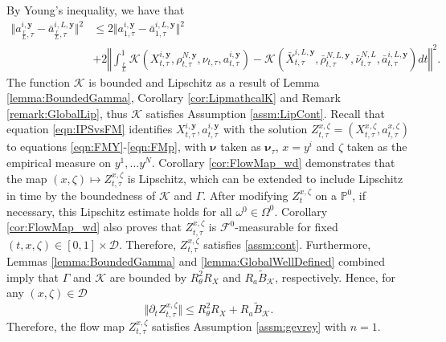 \documentclass{article}
\begin{document}
\begin{appendices}
By Young's inequality, we have that
\begin{align*}
    \Vert a^{i,\bm{y}}_{\frac{r}{L},\tau}-\bar a^{i,L,\bm{y}}_{\frac{r}{L},\tau}\Vert^2&\le 2\Vert a^{i,\bm{y}}_{1,\tau}-\bar a^{i,L,\bm{y}}_{1,\tau}\Vert^2\\& +2\left\Vert \int_\frac{r}{L}^1  \mathcal K(X^{i,\bm{y}}_{t,\tau},\rho^{N,\bm{y}}_{t,\tau},\nu_{t,\tau},a^{i,\bm{y}}_{t,\tau})- \mathcal K(\bar X^{i,L,\bm{y}}_{t,\tau},\bar \rho^{N,L,\bm{y}}_{t,\tau},\bar\nu^{N,L}_{t,\tau},\bar a^{i,L,\bm{y}}_{t,\tau})dt\right\Vert^2.
\end{align*}
 The function $\mathcal K$ is bounded and Lipschitz as a result of Lemma \ref{lemma:BoundedGamma}, Corollary \ref{cor:LipmathcalK} and Remark \ref{remark:GlobalLip}, thus $\mathcal K$ satisfies Assumption \ref{assm:LipCont}. Recall that equation \eqref{eqn:IPSvsFM} identifies $X^{i,\bm{y}}_{t,\tau},a^{i,\bm{y}}_{t,\tau}$ with the solution $Z^{x,\zeta}_{t,\tau}=(X^{x,\zeta}_{t,\tau},a^{x,\zeta}_{t,\tau})$ to equations \eqref{eqn:FMY}-\eqref{eqn:FMp}, with $\bm\nu$ taken as $\bm\nu_\tau$, $x=y^i$ and $\zeta$ taken as the empirical measure on $y^1,\ldots y^N$. Corollary \ref{cor:FlowMap_wd} demonstrates that the map $(x,\zeta)\mapsto Z^{x,\zeta}_{t,\tau}$ is Lipschitz, which can be extended to include Lipschitz in time by the boundedness of $\mathcal K$ and $\Gamma$. After modifying $Z^{x,\zeta}_t$ on a $\mathbb P^0$, if necessary, this Lipschitz estimate holds for all $\omega^0\in \Omega^0$. Corollary \ref{cor:FlowMap_wd} also proves that $Z^{x,\zeta}_{t,\tau}$ is $\mathcal F^0$-measurable for fixed $(t,x,\zeta)\in [0,1]\times \mathscr{D}$. Therefore, $Z^{x,\zeta}_{t,\tau}$ satisfies \ref{assm:cont}. Furthermore, Lemmas \ref{lemma:BoundedGamma} and \ref{lemma:GlobalWellDefined} combined imply that $\Gamma$ and $\mathcal K$ are bounded by $R_\theta^2R_X$ and $ R_a\tilde{B}_\mathcal{K}$, respectively. Hence, for any $(x,\zeta)\in \mathscr D$
 \[
 \Vert \partial_t Z^{x,\zeta}_{t,\tau}\Vert \le R_\theta^2R_X+R_a\tilde{B}_\mathcal{K}.
 \]
 Therefore, the flow map $Z^{x,\zeta}_{t,\tau}$ satisfies Assumption \ref{assm:gevrey} with $n=1$.\\
 

\end{appendices}
\end{document}
